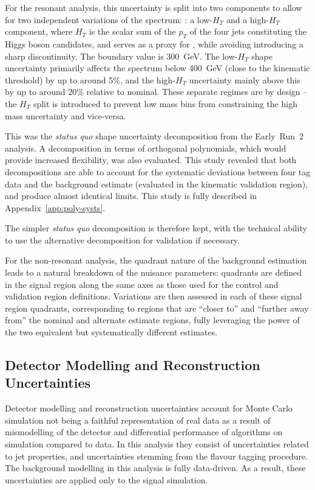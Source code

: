 For the resonant analysis, this uncertainty is split into two components to allow for two 
independent variations of the \mhh spectrum: : a low-$H_{T}$ and a high-$H_{T}$ component,
where $H_{T}$ is the scalar sum of the $p_{T}$ of the four jets constituting the
Higgs boson candidates, and serves as a proxy for \mhh, while avoiding
introducing a sharp discontinuity. The boundary value is \SI{300}{\GeV}. The
low-$H_{T}$ shape uncertainty primarily affects the \mhh spectrum below
\SI{400}{\GeV} (close to the kinematic threshold) by up to around 5\%, and the
high-$H_{T}$ uncertainty mainly \mhh above this by up to around 20\% relative to
nominal. These separate \mhh regimes are by design -- the $H_{T}$ split is 
introduced to prevent low mass bins from constraining the high mass uncertainty 
and vice-versa. 

This was the \emph{status quo} shape uncertainty decomposition from the
Early~Run~2 analysis. A decomposition in terms of orthogonal polynomials, which
would provide increased flexibility, was also evaluated. This study revealed
that both decompositions are able to account for the systematic deviations
between four tag data and the background estimate (evaluated in the kinematic
validation region), and produce almost identical limits. This study is fully
described in Appendix~\ref{app:poly-systs}.

The simpler \emph{status quo} decomposition is therefore kept, with the
technical ability to use the alternative decomposition for validation if
necessary.

For the non-resonant analysis, the quadrant nature of the background estimation
leads to a natural breakdown of the nuisance parameters: quadrants are defined 
in the signal region along the same axes as those used for the control and validation 
region definitions. Variations are then assessed in each of these signal region quadrants,
corresponding to regions that are ``closer to'' and ``further away from'' the 
nominal and alternate estimate regions, fully leveraging the power of the two
equivalent but systematically different estimates.

\subsection{Detector Modelling and Reconstruction Uncertainties}%
\label{subsec:modelling-uncerts}
Detector modelling and reconstruction uncertainties account for Monte Carlo
simulation not being a faithful representation of real data as a result of
mismodelling of the detector and differential performance of algorithms on
simulation compared to data. In this analysis they consist of uncertainties
related to jet properties, and uncertainties stemming from the flavour tagging
procedure. The background modelling in this analysis is fully data-driven. As a
result, these uncertainties are applied only to the signal simulation.


